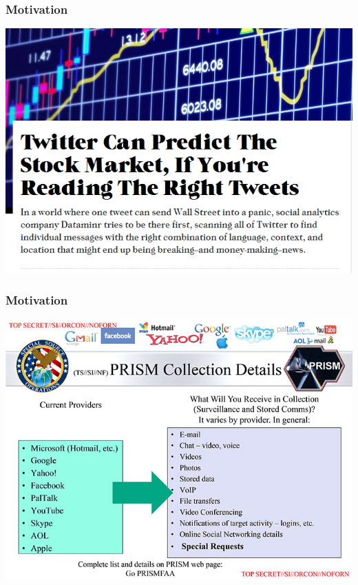 \documentclass{beamer}
\begin{document}
\begin{frame}
\frametitle{Motivation}
\pause
\begin{center}
\includegraphics[height=.8\textheight]{Images/twitter_fastco.PNG}
\end{center}
\end{frame}

\begin{frame}
\frametitle{Motivation}
\pause
\begin{center}
\includegraphics[height=.8\textheight]{Images/PRISM.jpg}
\end{center}
\end{frame}
\end{document}
